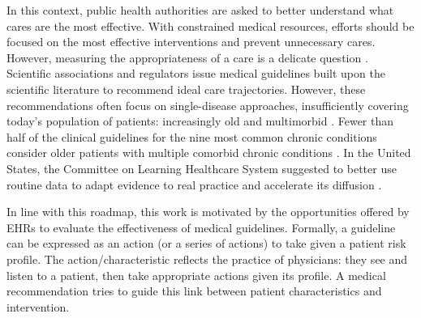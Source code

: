 \documentclass[french,12pt,twoside,a4paper]{book}
\def\sbc{\sffamily\fontseries{sbc}\selectfont}
\def\sbc{\fontseries{sbc}\selectfont}
\def\bsf#1{{\sffamily\sbc\fontsize{14}{11}\selectfont #1}}
\newcommand{\important}[1]{\textcolor{h_color}{\bsf{#1}}}
\begin{document}
In this context, public health authorities are asked to better understand what
cares are the most effective. With constrained medical resources, efforts should
be focused on the most effective interventions and prevent unnecessary cares.
However, measuring the appropriateness of a care is a delicate question
\citep{cma_policy_appropriateness_2015}. Scientific associations and regulators
issue medical guidelines built upon the scientific literature to recommend ideal
care trajectories. However, these recommendations often focus on single-disease
approaches, insufficiently covering today's population of patients: increasingly
old and multimorbid \citep{skou2022multimorbidity}. \important{Fewer than half of the
  clinical guidelines for the nine most common chronic conditions consider older
  patients with multiple comorbid chronic conditions}
\citep{boyd2005clinical,parekh2010challenge}. In the United States, the
Committee on Learning Healthcare System suggested to better use routine data to
adapt evidence to real practice and accelerate its diffusion
\citep{mcginnis2013best}.

In line with this roadmap, this work is motivated by the opportunities offered by
EHRs to evaluate the effectiveness of medical guidelines. Formally, a
guideline can be expressed as an action (or a series of actions) to take given a
patient risk profile. The action/characteristic reflects the
practice of  physicians: they see and listen to a patient, then take
appropriate actions given its profile. A medical recommendation tries to
guide this link between patient characteristics and intervention.
\end{document}
